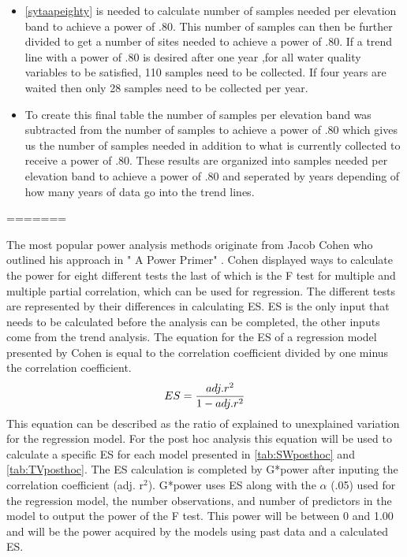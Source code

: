 \begin{itemize}
	\item \autoref{sytaapeighty} is needed to calculate number of samples needed per elevation band to achieve a power of .80.  This number of samples can then be further divided to get a number of sites needed to achieve a power of .80.  If a trend line with a power of .80 is desired after one year ,for all water quality variables to be satisfied, 110 samples need to be collected.  If four years are waited then only 28 samples need to be collected per year.
	\item  To create this final table the number of samples per elevation  band was subtracted from the number of samples to achieve a power of .80 which gives us the number of samples needed in addition to what is currently collected to receive a power of .80.  These results are organized into samples needed per elevation band to achieve a power of .80 and seperated by years depending of how many years of data go into the trend lines.

\end{itemize}
=======

The most popular power analysis methods originate from Jacob Cohen who outlined his approach in " A Power Primer" \citep{cohen1992power}.
Cohen displayed ways to calculate the power for eight different tests the last of which is the F test for multiple and multiple partial correlation, which can be used for regression.
The different tests are represented by their differences in calculating ES.
ES is the only input that needs to be calculated before the analysis can be completed, the other inputs come from the trend analysis.
The equation for the ES of a regression model presented by Cohen is equal to the correlation coefficient divided by one minus the correlation coefficient.
\begin{equation} \label{eq:ES}
	ES = {adj. r^2 \over {1-adj. r^2}}
\end{equation}
This equation can be described as the ratio of explained to unexplained variation for the regression model.
For the post hoc analysis this equation will be used to calculate a specific ES for each model presented in \autoref{tab:SWposthoc} and \autoref{tab:TVposthoc}.
The ES calculation is completed by G*power after inputing the correlation coefficient (adj. r$^2$).
G*power uses ES along with the $\alpha$ (.05) used for the regression model, the number observations, and number of predictors in the model to output the power of the F test.
This power will be between 0 and 1.00 and will be the power acquired by the models using past data and a calculated ES.

